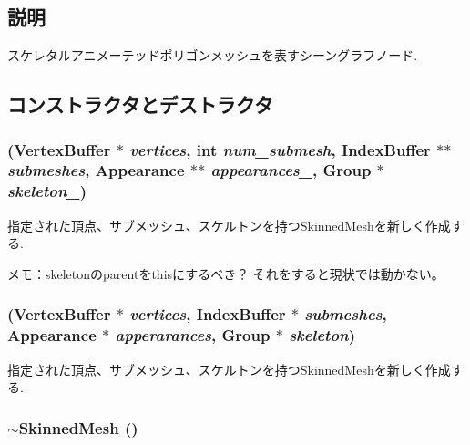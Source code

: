 \subsection{説明}
スケレタルアニメーテッドポリゴンメッシュを表すシーングラフノード. 

\subsection{コンストラクタとデストラクタ}
\hypertarget{classm3g_1_1SkinnedMesh_277419d6851b0e305f66a46095269915}{
\subsubsection[{SkinnedMesh}]{ ({\bf VertexBuffer} $\ast$ {\em vertices}, \/  int {\em num\_\-submesh}, \/  {\bf IndexBuffer} $\ast$$\ast$ {\em submeshes}, \/  {\bf Appearance} $\ast$$\ast$ {\em appearances\_\-}, \/  {\bf Group} $\ast$ {\em skeleton\_\-})}}
\label{classm3g_1_1SkinnedMesh_277419d6851b0e305f66a46095269915}


指定された頂点、サブメッシュ、スケルトンを持つSkinnedMeshを新しく作成する.

メモ：skeletonのparentをthisにするべき？ それをすると現状では動かない。 \hypertarget{classm3g_1_1SkinnedMesh_094bf88089897beeb8b8776e3bbb299d}{
\subsubsection[{SkinnedMesh}]{ ({\bf VertexBuffer} $\ast$ {\em vertices}, \/  {\bf IndexBuffer} $\ast$ {\em submeshes}, \/  {\bf Appearance} $\ast$ {\em apperarances}, \/  {\bf Group} $\ast$ {\em skeleton})}}
\label{classm3g_1_1SkinnedMesh_094bf88089897beeb8b8776e3bbb299d}


指定された頂点、サブメッシュ、スケルトンを持つSkinnedMeshを新しく作成する. \hypertarget{classm3g_1_1SkinnedMesh_c73da5b5c5f8f14fc241328b4b78928c}{
\subsubsection[{$\sim$SkinnedMesh}]{\setlength{\rightskip}{0pt plus 5cm}$\sim${\bf SkinnedMesh} ()}}
\label{classm3g_1_1SkinnedMesh_c73da5b5c5f8f14fc241328b4b78928c}


